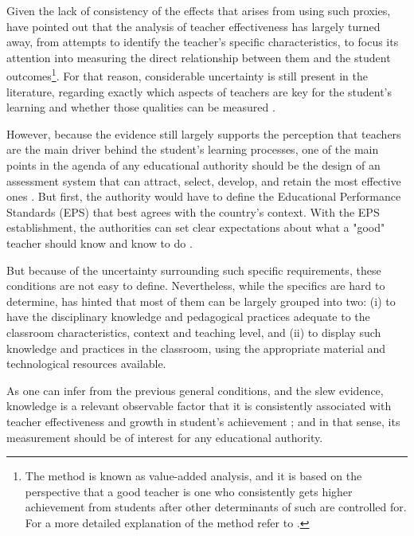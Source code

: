 Given the lack of consistency of the effects that arises from using such proxies, \citet{Hanushek_et_al_2012} have pointed out that the analysis of teacher effectiveness has largely turned away, from attempts to identify the teacher's specific characteristics, to focus its attention into measuring the direct relationship between them and the student outcomes\footnote{The method is known as value-added analysis, and it is based on the perspective that a good teacher is one who consistently gets higher achievement from students after other determinants of such are controlled for. For a more detailed explanation of the method refer to \citet{Scherrer_2011}.}. For that reason, considerable uncertainty is still present in the literature, regarding exactly which aspects of teachers are key for the student's learning and whether those qualities can be measured \citep{Rockoff_2004, Clotfelter_et_al_2006}.

However, because the evidence still largely supports the perception that teachers are the main driver behind the student's learning processes, one of the main points in the agenda of any educational authority should be the design of an assessment system that can attract, select, develop, and retain the most effective ones \citep{Elacqua_et_al_2018}. But first, the authority would have to define the Educational Performance Standards (EPS) that best agrees with the country's context. With the EPS establishment, the authorities can set clear expectations about what a "good" teacher should know and know to do \citep{Hincapie_et_al_2020}.

But because of the uncertainty surrounding such specific requirements, these conditions are not easy to define. Nevertheless, while the specifics are hard to determine, \citet{Hincapie_et_al_2020} has hinted that most of them can be largely grouped into two: (i) to have the disciplinary knowledge and pedagogical practices adequate to the classroom characteristics, context and teaching level, and (ii) to display such knowledge and practices in the classroom, using the appropriate material and technological resources available. 

As one can infer from the previous general conditions, and the slew evidence, knowledge is a relevant observable factor that it is consistently associated with teacher effectiveness and growth in student's achievement \citep{Santibanez_2006, Clotfelter_et_al_2006, Clotfelter_et_al_2007, Hanushek_et_al_2006, Marshall_2009, Rockoff_et_al_2011, Kane_et_al_2011, Kane_et_al_2012, Ome_2012, Metzler_et_al_2012, Kane_et_al_2013, Araujo_et_al_2016, Bietenbeck_et_al_2018, Estrada_2019}; and in that sense, its measurement should be of interest for any educational authority.

